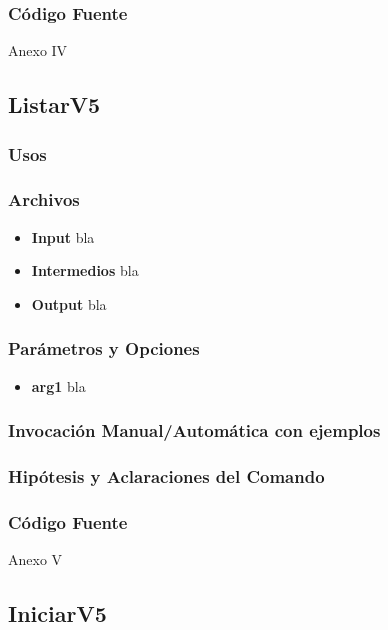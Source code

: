 \documentclass[a4paper,10pt,titlepage]{article}
\begin{document}
		\subsubsection{C\'odigo Fuente}
			Anexo IV

	\subsection{ListarV5}
		\subsubsection{Usos}
			 

		\subsubsection{Archivos}
			\begin {itemize}
				\item \textbf{Input} {bla}
				\item \textbf{Intermedios} {bla}
				\item \textbf{Output} {bla}
			\end{itemize}

		\subsubsection{Par\'ametros y Opciones}
			\begin {itemize}
				\item \textbf{arg1} {bla}
			\end{itemize}
	
		\subsubsection{Invocaci\'on Manual/Autom\'atica con ejemplos}

		\subsubsection{Hip\'otesis y Aclaraciones del Comando}

		\subsubsection{C\'odigo Fuente}
			Anexo V

	\subsection{IniciarV5}
\end{document}
